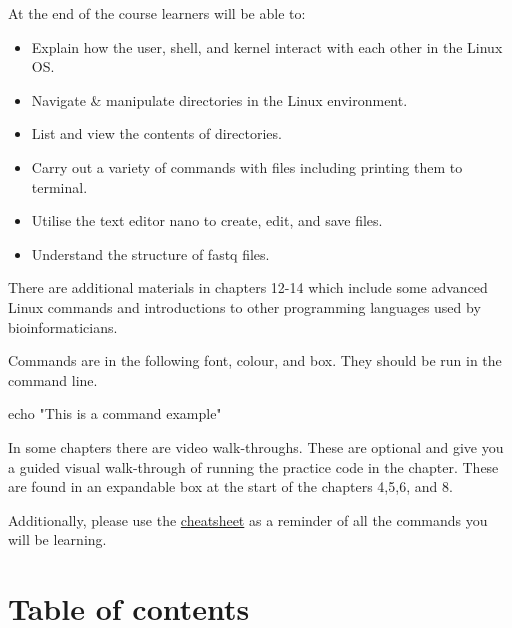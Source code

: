 \documentclass[
  letterpaper,
  DIV=11,
  numbers=noendperiod]{scrreprt}
\newenvironment{Shaded}{\begin{snugshade}}{\end{snugshade}}
\newcommand{\BuiltInTok}[1]{\textcolor[rgb]{0.00,0.23,0.31}{#1}}
\newcommand{\StringTok}[1]{\textcolor[rgb]{0.13,0.47,0.30}{#1}}
\providecommand{\tightlist}{%
  \setlength{\itemsep}{0pt}\setlength{\parskip}{0pt}}\usepackage{longtable,booktabs,array}
\begin{document}
At the end of the course learners will be able to:

\begin{itemize}
\tightlist
\item
  Explain how the user, shell, and kernel interact with each other in
  the Linux OS.
\item
  Navigate \& manipulate directories in the Linux environment.
\item
  List and view the contents of directories.
\item
  Carry out a variety of commands with files including printing them to
  terminal.
\item
  Utilise the text editor nano to create, edit, and save files.
\item
  Understand the structure of fastq files.
\end{itemize}

There are additional materials in chapters 12-14 which include some
advanced Linux commands and introductions to other programming languages
used by bioinformaticians.

Commands are in the following font, colour, and box. They should be run
in the command line.

\begin{Shaded}
\begin{Highlighting}[]
\BuiltInTok{echo} \StringTok{"This is a command example"} 
\end{Highlighting}
\end{Shaded}

In some chapters there are video walk-throughs. These are optional and
give you a guided visual walk-through of running the practice code in
the chapter. These are found in an expandable box at the start of the
chapters 4,5,6, and 8.

Additionally, please use the \protect\hyperlink{cheatsheet}{cheatsheet}
as a reminder of all the commands you will be learning.

\hypertarget{table-of-contents}{%
\section*{Table of contents}\label{table-of-contents}}

\end{document}
